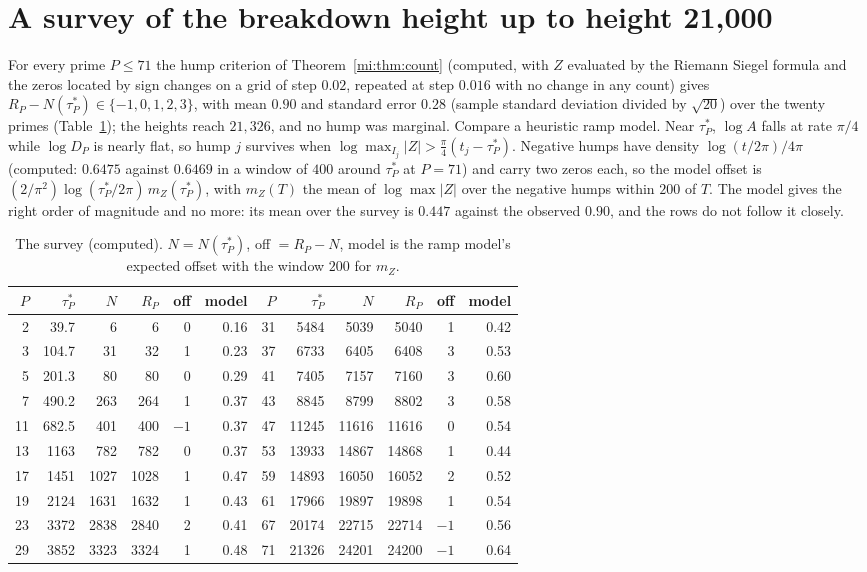 \section{A survey of the breakdown height up to height 21,000}\label{mi:sec:survey}

For every prime $P\le71$ the hump criterion of Theorem~\ref{mi:thm:count} (computed, with $Z$ evaluated by the Riemann Siegel formula and the zeros located by sign changes on a grid of step $0.02$, repeated at step $0.016$ with no change in any count) gives $R_P-N(\tau_P^*)\in\{-1,0,1,2,3\}$, with mean $0.90$ and standard error $0.28$ (sample standard deviation divided by $\sqrt{20}$) over the twenty primes (Table~\ref{mi:tab:survey}); the heights reach $21{,}326$, and no hump was marginal. Compare a heuristic ramp model. Near $\tau_P^*$, $\log A$ falls at rate $\pi/4$ while $\log D_P$ is nearly flat, so hump $j$ survives when $\log\max_{I_j}|Z|>\tfrac\pi4(t_j-\tau_P^*)$. Negative humps have density $\log(t/2\pi)/4\pi$ (computed: $0.6475$ against $0.6469$ in a window of $400$ around $\tau_P^*$ at $P=71$) and carry two zeros each, so the model offset is $(2/\pi^2)\log(\tau_P^*/2\pi)\,m_Z(\tau_P^*)$, with $m_Z(T)$ the mean of $\log\max|Z|$ over the negative humps within $200$ of $T$. The model gives the right order of magnitude and no more: its mean over the survey is $0.447$ against the observed $0.90$, and the rows do not follow it closely.

\begin{table}[ht]
\centering
\footnotesize
\setlength{\tabcolsep}{3.5pt}
\begin{tabular}{rrrrrr|rrrrrr}
\toprule
$P$ & $\tau_P^*$ & $N$ & $R_P$ & off & model & $P$ & $\tau_P^*$ & $N$ & $R_P$ & off & model\\
\midrule
2 & 39.7 & 6 & 6 & 0 & 0.16 & 31 & 5484 & 5039 & 5040 & 1 & 0.42 \\
3 & 104.7 & 31 & 32 & 1 & 0.23 & 37 & 6733 & 6405 & 6408 & 3 & 0.53 \\
5 & 201.3 & 80 & 80 & 0 & 0.29 & 41 & 7405 & 7157 & 7160 & 3 & 0.60 \\
7 & 490.2 & 263 & 264 & 1 & 0.37 & 43 & 8845 & 8799 & 8802 & 3 & 0.58 \\
11 & 682.5 & 401 & 400 & $-1$ & 0.37 & 47 & 11245 & 11616 & 11616 & 0 & 0.54 \\
13 & 1163 & 782 & 782 & 0 & 0.37 & 53 & 13933 & 14867 & 14868 & 1 & 0.44 \\
17 & 1451 & 1027 & 1028 & 1 & 0.47 & 59 & 14893 & 16050 & 16052 & 2 & 0.52 \\
19 & 2124 & 1631 & 1632 & 1 & 0.43 & 61 & 17966 & 19897 & 19898 & 1 & 0.54 \\
23 & 3372 & 2838 & 2840 & 2 & 0.41 & 67 & 20174 & 22715 & 22714 & $-1$ & 0.56 \\
29 & 3852 & 3323 & 3324 & 1 & 0.48 & 71 & 21326 & 24201 & 24200 & $-1$ & 0.64 \\
\bottomrule
\end{tabular}
\caption{The survey (computed). $N=N(\tau_P^*)$, off $=R_P-N$, model is the ramp model's expected offset with the window $200$ for $m_Z$.}
\label{mi:tab:survey}
\end{table}

